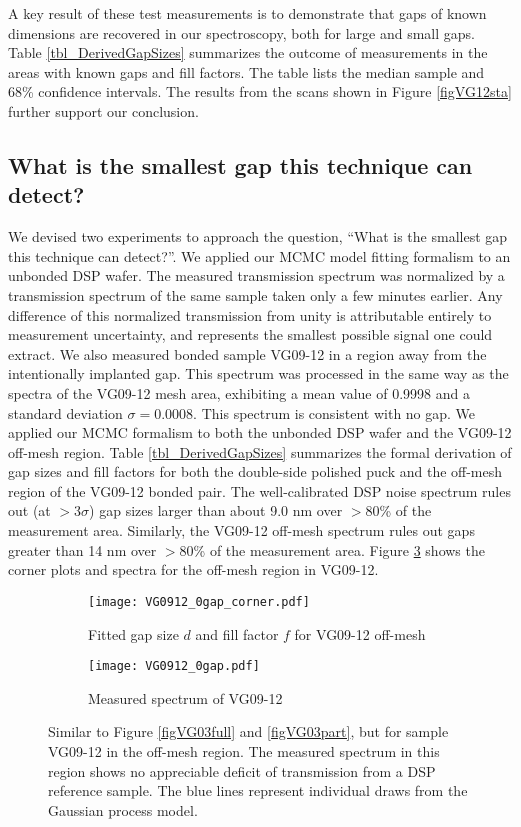 \documentclass[osajnl,twocolumn,showpacs,superscriptaddress,11pt]{revtex4-1} %
\begin{document}
A key result of these test measurements is to demonstrate that gaps of known dimensions are recovered in our spectroscopy, both for large and small gaps.  Table \ref{tbl_DerivedGapSizes} summarizes the outcome of measurements in the areas with known gaps and fill factors.  The table lists the median sample and 68\% confidence intervals.  The results from the scans shown in Figure \ref{figVG12sta} further support our conclusion.

\subsection{What is the smallest gap this technique can detect?}
We devised two experiments to approach the question, ``What is the smallest gap this technique can detect?''.  We applied our MCMC model fitting formalism to an unbonded DSP wafer.  The measured transmission spectrum was normalized by a transmission spectrum of the same sample taken only a few minutes earlier.  Any difference of this normalized transmission from unity is attributable entirely to measurement uncertainty, and represents the smallest possible signal one could extract.  We also measured bonded sample VG09-12 in a region away from the intentionally implanted gap.  This spectrum was processed in the same way as the spectra of the VG09-12 mesh area, exhibiting a mean value of 0.9998 and a standard deviation $\sigma=0.0008$.  This spectrum is consistent with no gap.  We applied our MCMC formalism to both the unbonded DSP wafer and the VG09-12 off-mesh region.  Table \ref{tbl_DerivedGapSizes} summarizes the formal derivation of gap sizes and fill factors for both the double-side polished puck and the off-mesh region of the VG09-12 bonded pair.  The well-calibrated DSP noise spectrum rules out (at $>3\sigma$) gap sizes larger than about 9.0 nm over $>80$\% of the measurement area.  Similarly, the VG09-12 off-mesh spectrum rules out gaps greater than 14 nm over $>80$\% of the measurement area.  Figure \ref{figVG12} shows the corner plots and spectra for the off-mesh region in VG09-12.

\begin{figure}[htbp]
    \centering
    \begin{subfigure}[b]{0.5\textwidth}
        \texttt{[image: VG0912\_0gap\_corner.pdf]}
        \caption{Fitted gap size $d$ and fill factor $f$ for VG09-12 off-mesh}
	\label{VG0912_0gap_corner}
    \end{subfigure}
    \begin{subfigure}[b]{0.5\textwidth}
        \texttt{[image: VG0912\_0gap.pdf]}
        \caption{Measured spectrum of VG09-12}
        \label{VG0912_0gap}
    \end{subfigure}
\caption{Similar to Figure \ref{figVG03full} and \ref{figVG03part}, but for sample VG09-12 in the off-mesh region.  The measured spectrum in this region shows no appreciable deficit of transmission from a DSP reference sample.  The blue lines represent individual draws from the Gaussian process model.  
\label{figVG12}}
\end{figure}
\end{document}
